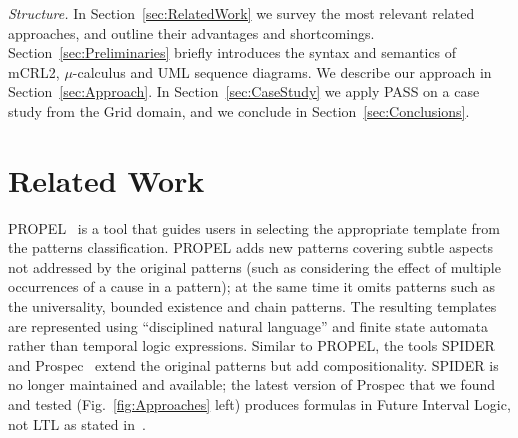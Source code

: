 \documentclass[letter]{llncs}
\begin{document}
\noindent\emph{Structure.}
In Section~\ref{sec:RelatedWork} we
 survey the most relevant related approaches,
and outline their advantages and
shortcomings. Section~\ref{sec:Preliminaries} briefly introduces
the syntax and semantics of mCRL2, $\mu$-calculus and UML sequence
diagrams.  We describe our approach in Section~\ref{sec:Approach}.
In Section~\ref{sec:CaseStudy} we apply PASS on a case study from the
Grid domain, and we conclude in Section~\ref{sec:Conclusions}.
\vspace{-7 pt}

\section{Related Work}
\vspace{-7 pt}

\label{sec:RelatedWork}
PROPEL~\cite{Smith02propel:an} is a tool that
guides users in selecting the appropriate template from the patterns
classification. PROPEL adds new patterns covering subtle aspects
not addressed by the original patterns (such as considering the effect
of multiple occurrences of a cause in a pattern); at the same time it
omits patterns such as the universality, bounded
existence and chain patterns. The resulting templates are represented
using ``disciplined natural language'' and finite state automata rather
than temporal logic expressions.
%
Similar to PROPEL, the tools SPIDER~\cite{konrad2005facilitating}
and Prospec~\cite{Mondragon_prospec} extend the original patterns but
add compositionality.  SPIDER is no longer maintained and
available; the latest version of Prospec that we found and tested
(Fig.~\ref{fig:Approaches} left) produces formulas in Future Interval
Logic, not LTL as stated in~\cite{Mondragon_prospec}.
\end{document}
